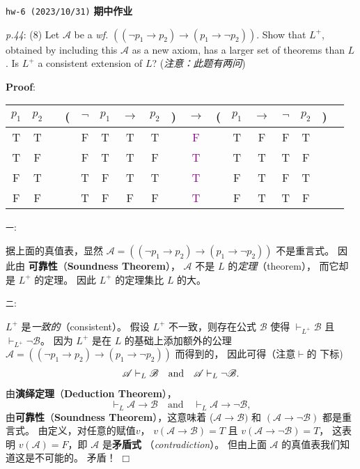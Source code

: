 \documentclass[UTF8,12pt,a4paper]{ctexart}
\begin{document}
\noindent\texttt{hw-6 (2023/10/31)}  \textbf{期中作业}

\emph{p.44}: (8) \quad
Let $\mathscr{A}$ be a \textit{wf.} $((\neg p_1 \to p_2) \to (p_1 \to \neg p_2))$. 
Show that $L^+$, obtained by including this $\mathscr{A}$ as a new axiom, has a larger set of theorems than $L$. Is $L^+$ a consistent extension of $L$?
(\textit{注意：此题有两问})

\noindent\textbf{Proof}:

\begin{center}
	\begin{tabular}{@{ }c@{ }@{ }c | c@{ }@{}c@{}@{ }c@{ }@{ }c@{ }@{ }c@{ }@{ }c@{ }@{}c@{}@{ }c@{ }@{}c@{}@{ }c@{ }@{ }c@{ }@{ }c@{ }@{ }c@{ }@{}c@{}@{ }c}
		$p_1$ & $p_2$ &  & ( & $\lnot$ & $p_1$ & $\to$ & $p_2$ & ) & $\to$ & ( & $p_1$ & $\to$ & $\lnot$ & $p_2$ & ) & \\
		\hline 
		T & T &  &  & F & T & T & T &  & \textcolor{purple}{F} &  & T & F & F & T &  & \\
		T & F &  &  & F & T & T & F &  & \textcolor{purple}{T} &  & T & T & T & F &  & \\
		F & T &  &  & T & F & T & T &  & \textcolor{purple}{T} &  & F & T & F & T &  & \\
		F & F &  &  & T & F & F & F &  & \textcolor{purple}{T} &  & F & T & T & F &  & \\
	\end{tabular}
\end{center}

\texttt{一}:

据上面的真值表，显然 $\mathscr{A} = ((\neg p_1 \to p_2) \to (p_1 \to \neg p_2))$ 不是重言式。
因此由 \textbf{可靠性}（\textbf{Soundness Theorem}）， 
$\mathscr{A}$  {\color{purple} 不是} $L$ 的\textit{定理}（theorem）， 
而它却是 $L^+$ 的定理。
因此 $L^+$ 的定理集比 $L$ 的大。

\texttt{二}:

$L^+$ 是\textit{一致的}（consistent）。
假设 $L^+$ 不一致，则存在公式 $\mathscr{B}$ 使得 
$\vdash_{L^+} \mathscr{B}$  且	$\vdash_{L^+} \neg \mathscr{B}$。
因为 $L^+$ 是在 $L$ 的基础上添加额外的公理 $\mathscr{A} = ((\neg p_1 \to p_2) \to (p_1 \to \neg p_2))$ 而得到的，
因此可得（注意$\vdash$的{\color{purple} 下标})
\[\begin{array}{l l l}
	\mathscr{A} \vdash_{L} \mathscr{B}  \quad \text{and} \quad	
	\mathscr{A} \vdash_{L} \neg \mathscr{B}. \\
\end{array}\]
由\textbf{演绎定理}（\textbf{Deduction Theorem}），
\[
\vdash_{L} \mathscr{A} \to \mathscr{B}  \quad \text{and} \quad	
\vdash_{L} \mathscr{A} \to \neg \mathscr{B}, 
\]
由\textbf{可靠性}（\textbf{Soundness Theorem}），这意味着
($\mathscr{A} \to \mathscr{B})$ 和 $(\mathscr{A} \to \neg \mathscr{B})$ 都是重言式。
由定义，对任意的赋值$v$，
$v(\mathscr{A} \to \mathscr{B})  = T$ 且  $v(\mathscr{A} \to \neg \mathscr{B})  = T$，
这表明
$v(\mathscr{A}) = F$，即 $\mathscr{A}$ 是\textbf{矛盾式} （\textit{contradiction}）。
但由上面  $\mathscr{A}$ 的真值表我们知道这是不可能的。
矛盾！
\hfill $\Box$
\end{document}
